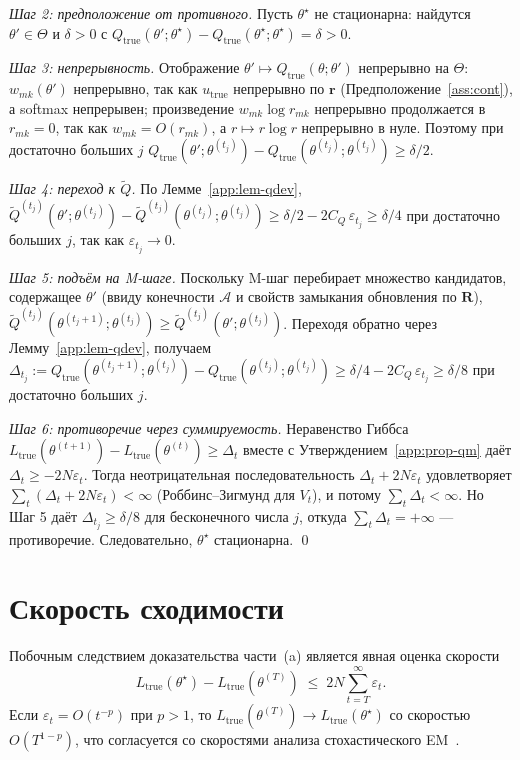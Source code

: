 \emph{Шаг 2: предположение от противного.} Пусть $\theta^{\star}$ не
стационарна: найдутся $\theta'\in\Theta$ и $\delta > 0$ с
$Q_{\mathrm{true}}(\theta';\theta^{\star}) -
Q_{\mathrm{true}}(\theta^{\star};\theta^{\star}) = \delta > 0$.

\emph{Шаг 3: непрерывность.} Отображение
$\theta'\mapsto Q_{\mathrm{true}}(\theta;\theta')$ непрерывно на
$\Theta$: $w_{mk}(\theta')$ непрерывно, так как $u_{\mathrm{true}}$
непрерывно по $\mathbf{r}$ (Предположение~\ref{ass:cont}), а softmax
непрерывен; произведение $w_{mk}\log r_{mk}$ непрерывно продолжается в
$r_{mk} = 0$, так как $w_{mk} = O(r_{mk})$, а $r\mapsto r\log r$
непрерывно в нуле. Поэтому при достаточно больших $j$
$Q_{\mathrm{true}}(\theta';\theta^{(t_j)}) -
Q_{\mathrm{true}}(\theta^{(t_j)};\theta^{(t_j)}) \geq \delta/2$.

\emph{Шаг 4: переход к $\tilde Q$.} По Лемме~\ref{app:lem-qdev},
$\tilde Q^{(t_j)}(\theta';\theta^{(t_j)}) -
\tilde Q^{(t_j)}(\theta^{(t_j)};\theta^{(t_j)}) \geq
\delta/2 - 2C_Q\,\varepsilon_{t_j} \geq \delta/4$
при достаточно больших $j$, так как $\varepsilon_{t_j}\to 0$.

\emph{Шаг 5: подъём на M-шаге.} Поскольку M-шаг перебирает множество
кандидатов, содержащее $\theta'$ (ввиду конечности $\mathcal{A}$ и
свойств замыкания обновления по $\mathbf{R}$),
$\tilde Q^{(t_j)}(\theta^{(t_j+1)};\theta^{(t_j)}) \geq
\tilde Q^{(t_j)}(\theta';\theta^{(t_j)})$. Переходя обратно через
Лемму~\ref{app:lem-qdev}, получаем
$\Delta_{t_j} := Q_{\mathrm{true}}(\theta^{(t_j+1)};\theta^{(t_j)}) -
Q_{\mathrm{true}}(\theta^{(t_j)};\theta^{(t_j)}) \geq
\delta/4 - 2C_Q\,\varepsilon_{t_j} \geq \delta/8$
при достаточно больших $j$.

\emph{Шаг 6: противоречие через суммируемость.} Неравенство Гиббса
$L_{\mathrm{true}}(\theta^{(t+1)}) - L_{\mathrm{true}}(\theta^{(t)})
\geq \Delta_t$ вместе с Утверждением~\ref{app:prop-qm} даёт
$\Delta_t \geq -2N\varepsilon_t$. Тогда неотрицательная
последовательность $\Delta_t + 2N\varepsilon_t$ удовлетворяет
$\sum_t (\Delta_t + 2N\varepsilon_t) < \infty$ (Роббинс--Зигмунд для
$V_t$), и потому $\sum_t \Delta_t < \infty$. Но Шаг 5 даёт
$\Delta_{t_j} \geq \delta/8$ для бесконечного числа $j$, откуда
$\sum_t \Delta_t = +\infty$ --- противоречие. Следовательно,
$\theta^{\star}$ стационарна. \qed

\section{Скорость сходимости}
\label{app:rate}

Побочным следствием доказательства части~(a) является явная оценка
скорости
\[
L_{\mathrm{true}}(\theta^{\star}) - L_{\mathrm{true}}(\theta^{(T)})
\;\leq\; 2N \sum_{t = T}^{\infty} \varepsilon_t.
\]
Если $\varepsilon_t = O(t^{-p})$ при $p > 1$, то
$L_{\mathrm{true}}(\theta^{(T)}) \to L_{\mathrm{true}}(\theta^{\star})$
со скоростью $O(T^{1 - p})$, что согласуется со скоростями анализа
стохастического EM~\cite{cappe2009online}.

